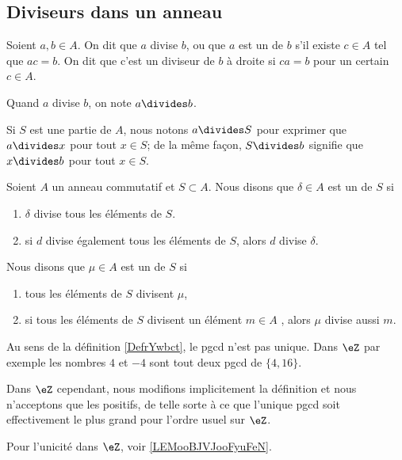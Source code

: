 \subsection{Diviseurs dans un anneau}

\begin{definition}\label{DiviseursAnneau}
	Soient \( a, b \in A \). On dit que $a$ divise $b$, ou que $a$ est un  de $b$ s'il existe \( c \in A \) tel que \( ac = b \). On dit que c'est un diviseur de $b$ à droite si \( ca = b \) pour un certain \( c \in A \).
	
	Quand $a$ divise $b$, on note \( a\divides b\).
	
	 Si \( S\) est une partie de \( A\), nous notons \( a\divides S\) pour exprimer que \( a\divides x\) pour tout \( x\in S\); de la même façon, \( S\divides b\) signifie que \( x\divides b\) pour tout \( x\in S\).
\end{definition}

\begin{definition}\label{DefrYwbct}
    Soient \( A\) un anneau commutatif et \( S\subset A\). Nous disons que \( \delta\in A\) est un  de \( S\) si
    \begin{enumerate}
        \item
            \( \delta\) divise tous les éléments de \( S\).
        \item
            si \( d\) divise également tous les éléments de \( S\), alors \( d\) divise \( \delta\).
    \end{enumerate}
    Nous disons que \( \mu\in A\) est un  de \( S\) si
    \begin{enumerate}
        \item
            tous les éléments de \( S\) divisent \( \mu\),
        \item
            si tous les éléments de \( S\) divisent un élément \( m \in A\) , alors \( \mu \) divise aussi \( m\).
    \end{enumerate}
\end{definition}

\begin{remark}
    Au sens de la définition \ref{DefrYwbct}, le pgcd n'est pas unique. Dans \( \eZ\) par exemple les nombres \( 4\) et \( -4\) sont tout deux pgcd de \( \{4,16  \}\).

    Dans \( \eZ\) cependant, nous modifions implicitement la définition et nous n'acceptons que les positifs, de telle sorte à ce que l'unique pgcd soit effectivement le plus grand pour l'ordre usuel sur \( \eZ\).

    Pour l'unicité dans \( \eZ\), voir \ref{LEMooBJVJooFyuFeN}.
\end{remark}


